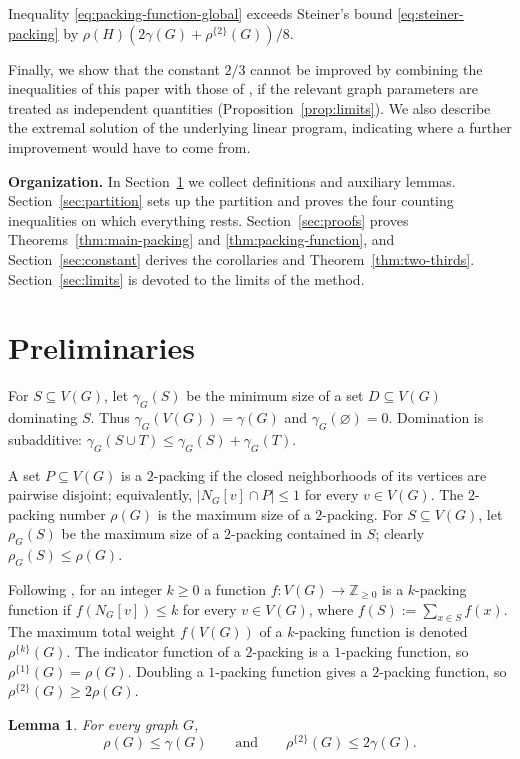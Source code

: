 \documentclass[10pt]{amsart}
\newtheorem{lemma}[theorem]{Lemma}
\theoremstyle{remark}
\newcommand{\N}{N}
\newcommand{\V}{V}
\newcommand{\rhoTwo}{\rho^{\{2\}}}
\begin{document}
Inequality \eqref{eq:packing-function-global} exceeds Steiner's bound
\eqref{eq:steiner-packing} by
$\rho(H)(2\gamma(G)+\rhoTwo(G))/8$.

Finally, we show that the constant $2/3$ cannot be improved by combining the
inequalities of this paper with those of \cite{Steiner2026}, if the relevant
graph parameters are treated as independent quantities
(Proposition~\ref{prop:limits}). We also describe the extremal solution of the
underlying linear program, indicating where a further improvement would have
to come from.

\medskip
\noindent\textbf{Organization.}
In Section~\ref{sec:prelim} we collect definitions and auxiliary lemmas.
Section~\ref{sec:partition} sets up the partition and proves the four counting
inequalities on which everything rests. Section~\ref{sec:proofs} proves
Theorems~\ref{thm:main-packing} and \ref{thm:packing-function}, and
Section~\ref{sec:constant} derives the corollaries and
Theorem~\ref{thm:two-thirds}. Section~\ref{sec:limits} is devoted to the limits of
the method.

\section{Preliminaries}\label{sec:prelim}

For $S\subseteq\V(G)$, let $\gamma_G(S)$ be the minimum size of a set
$D\subseteq\V(G)$ dominating $S$. Thus $\gamma_G(\V(G))=\gamma(G)$ and
$\gamma_G(\varnothing)=0$. Domination is subadditive:
$\gamma_G(S\cup T)\leq\gamma_G(S)+\gamma_G(T)$.

A set $P\subseteq\V(G)$ is a $2$-packing if the closed neighborhoods of its
vertices are pairwise disjoint; equivalently,
$|\N_G[v]\cap P|\leq 1$ for every $v\in\V(G)$. The $2$-packing number
$\rho(G)$ is the maximum size of a $2$-packing. For $S\subseteq\V(G)$, let
$\rho_G(S)$ be the maximum size of a $2$-packing contained in $S$; clearly
$\rho_G(S)\leq\rho(G)$.

Following \cite{GoddardHenning2020,Steiner2026}, for an integer $k\geq0$ a
function $f:\V(G)\to\mathbb Z_{\geq0}$ is a $k$-packing function if
$f(\N_G[v])\leq k$ for every $v\in\V(G)$, where
$f(S):=\sum_{x\in S}f(x)$. The maximum total weight $f(\V(G))$ of a
$k$-packing function is denoted $\rho^{\{k\}}(G)$. The indicator function of
a $2$-packing is a $1$-packing function, so $\rho^{\{1\}}(G)=\rho(G)$.
Doubling a $1$-packing function gives a $2$-packing function, so
$\rhoTwo(G)\geq 2\rho(G)$.

\begin{lemma}\label{lem:packing-upper}
For every graph $G$,
\[
 \rho(G)\leq\gamma(G)
 \qquad\text{and}\qquad
 \rhoTwo(G)\leq2\gamma(G).
\]
\end{lemma}
\end{document}
